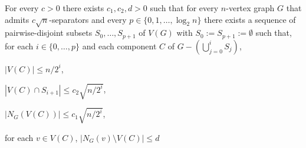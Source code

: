 \documentclass{patmorin}
\renewcommand{\le}{\leqslant}
\begin{document}
\begin{lem}\label{recursive_separator}
  For every $c>0$ there exists $c_1,c_2,d>0$ such that for every $n$-vertex graph $G$ that admits $c\sqrt{n}$-separators and every $p\in\{0,1,\ldots,\log_2 n\}$ there exists a sequence of pairwise-disjoint subsets $S_0,\ldots,S_{p+1}$ of $V(G)$ with $S_0:=S_{p+1}:=\emptyset$ such that, for each $i\in\{0,\ldots,p\}$ and each component $C$ of $G-(\bigcup_{j=0}^i S_j)$,
  \begin{compactenum}[(a)]
    \item $|V(C)|\le n/2^i$,
    \item $|V(C)\cap S_{i+1}|\le c_2\sqrt{n/2^i}$,
    \item $|N_G(V(C))|\le c_1\sqrt{n/2^i}$,
    \item for each $v\in V(C)$, $|N_G(v)\setminus V(C)|\le d$
  \end{compactenum}
\end{lem}
\end{document}
